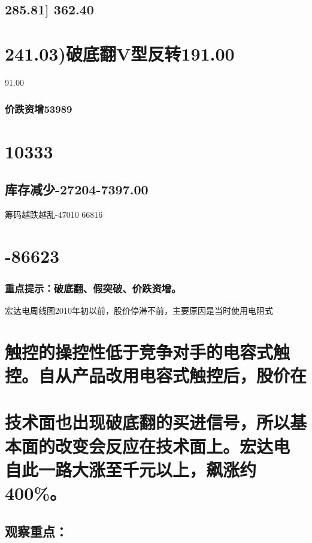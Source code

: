 \documentclass{article}
\begin{document}
\subsection{285.81] 362.40}

\section{241.03)破底翻V型反转191.00}

91.00

\subsubsection{价跌资增53989}

\section{10333}

\subsection{库存减少-27204-7397.00}

筹码越跌越乱-47010 66816

\section{-86623}

\subsubsection{重点提示：破底翻、假突破、价跌资增。}

宏达电周线图2010年初以前，股价停滞不前，主要原因是当时使用电阻式

\section{触控的操控性低于竞争对手的电容式触控。自从产品改用电容式触控后，股价在}

\section{技术面也出现破底翻的买进信号，所以基本面的改变会反应在技术面上。宏达电 自此一路大涨至千元以上，飙涨约400\%。}

\subsection{观察重点：}
\end{document}
